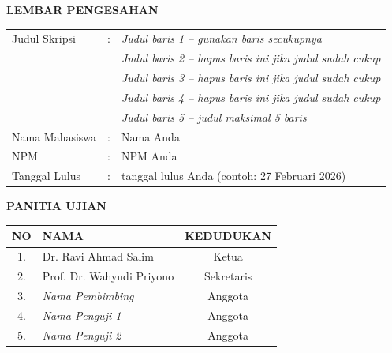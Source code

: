 \clearpage
\thispagestyle{empty} %

\begin{singlespace} %
	
	\begin{center}
		\textbf{\Large LEMBAR PENGESAHAN}
	\end{center}
	
	\vspace{1cm}
	
	\noindent
	\begin{tabular}{@{}l l l}
		Judul Skripsi & : & \textit{Judul baris 1 -- gunakan baris secukupnya} \\
		&   & \textit{Judul baris 2 -- hapus baris ini jika judul sudah cukup} \\
		&   & \textit{Judul baris 3 -- hapus baris ini jika judul sudah cukup} \\
		&   & \textit{Judul baris 4 -- hapus baris ini jika judul sudah cukup} \\
		&   & \textit{Judul baris 5 -- judul maksimal 5 baris} \\
		[0.3cm]
		Nama Mahasiswa & : & Nama Anda \\
		[0.1cm]
		NPM           & : & NPM Anda \\
		[0.1cm]
		Tanggal Lulus & : & tanggal lulus Anda (contoh: 27 Februari 2026) \\
	\end{tabular}
	
	\vspace{1cm}
	
	\begin{center}
		\textbf{PANITIA UJIAN}
	\end{center}
	
	\begin{center}
		\begin{tabular}{|c|p{8cm}|c|}
			\hline
			\textbf{NO} & \centering\textbf{NAMA} & \textbf{KEDUDUKAN} \\
			\hline
			1. & Dr. Ravi Ahmad Salim & Ketua \\
			\hline
			2. & Prof. Dr. Wahyudi Priyono & Sekretaris \\
			\hline
			3. & \textit{Nama Pembimbing} & Anggota \\
			\hline
			4. & \textit{Nama Penguji 1} & Anggota \\
			\hline
			5. & \textit{Nama Penguji 2} & Anggota \\
			\hline
		\end{tabular}
	\end{center}
	

\end{singlespace}
